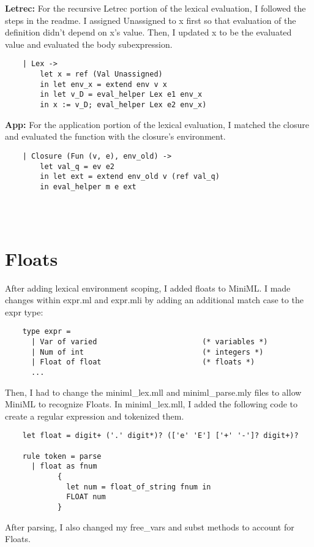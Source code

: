 \documentclass{article}
\begin{document}
\textbf{Letrec:} For the recursive Letrec portion of the lexical evaluation, I followed the steps in the readme. I assigned Unassigned to x first so that evaluation of the definition didn't depend on x's value. Then, I updated x to be the evaluated value and evaluated the body subexpression.
\begin{verbatim}
    | Lex -> 
        let x = ref (Val Unassigned)
        in let env_x = extend env v x
        in let v_D = eval_helper Lex e1 env_x
        in x := v_D; eval_helper Lex e2 env_x)
\end{verbatim}
\textbf{App:} For the application portion of the lexical evaluation, I matched the closure and evaluated the function with the closure's environment. 
\begin{verbatim}
    | Closure (Fun (v, e), env_old) -> 
        let val_q = ev e2 
        in let ext = extend env_old v (ref val_q)
        in eval_helper m e ext


        
\end{verbatim}

\section{Floats}
After adding lexical environment scoping, I added floats to MiniML. I made changes within expr.ml and expr.mli by adding an additional match case to the expr type:
\begin{verbatim}
    type expr =
      | Var of varied                        (* variables *)
      | Num of int                           (* integers *)
      | Float of float                       (* floats *)
      ...
\end{verbatim}
Then, I had to change the miniml\_lex.mll and miniml\_parse.mly files to allow MiniML to recognize Floats. In miniml\_lex.mll, I added the following code to create a regular expression and tokenized them. 
\begin{verbatim}
    let float = digit+ ('.' digit*)? (['e' 'E'] ['+' '-']? digit+)?
    
    rule token = parse
      | float as fnum 
            {
              let num = float_of_string fnum in
              FLOAT num
            }
\end{verbatim} 
After parsing, I also changed my free\_vars and subst methods to account for Floats. 
\end{document}
